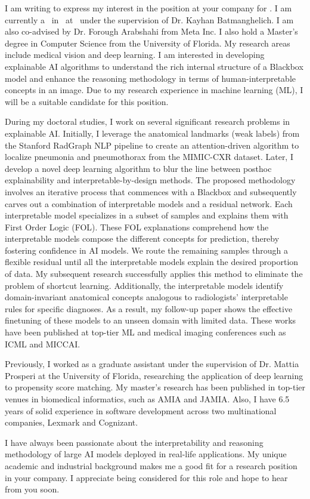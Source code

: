 I am writing to express my interest in the \job position at your company for \timeline. I am currently a \mytitle~in \major~at \university~under the supervision of Dr. Kayhan Batmanghelich. I am also co-advised by Dr. Forough Arabshahi from Meta Inc. I also hold a Master's degree in Computer Science from the University of Florida.
My research areas include medical vision and deep learning. I am interested in developing explainable AI algorithms to understand the rich internal structure of a Blackbox model and enhance the reasoning methodology in terms of human-interpretable concepts in an image. Due to my research experience in machine learning (ML), I will be a suitable candidate for this position.

During my doctoral studies, I work on several significant research problems in explainable AI. Initially, I leverage the anatomical landmarks (weak labels) from the Stanford RadGraph NLP pipeline to create an attention-driven algorithm to localize pneumonia and pneumothorax from the MIMIC-CXR dataset. Later, I develop a novel deep learning algorithm to blur the line between posthoc explainability and interpretable-by-design methods. The proposed methodology involves an iterative process that commences with a Blackbox and subsequently carves out a combination of interpretable models and a residual network. Each interpretable model
specializes in a subset of samples and explains
them with First Order Logic (FOL). These FOL explanations comprehend how the interpretable models compose the different concepts for prediction, thereby fostering confidence in AI models.
We route the remaining samples through a flexible
residual until all the interpretable models explain
the desired proportion of data. My subsequent research successfully applies this method to eliminate the problem of shortcut learning. Additionally, the interpretable models identify domain-invariant anatomical concepts analogous to radiologists' interpretable rules for specific diagnoses. As a result, my follow-up paper shows the effective finetuning of these models to an unseen domain with limited data. These works have been published at top-tier ML and medical imaging conferences such as ICML and MICCAI.

Previously, I worked as a graduate assistant under the supervision of Dr. Mattia Prosperi at the University of Florida, researching the application of deep learning to propensity score matching. My master's research has been published in top-tier venues in biomedical informatics, such as AMIA and JAMIA. Also, I have 6.5 years of solid experience in software development across two multinational companies, Lexmark and Cognizant.

I have always been passionate about the interpretability and reasoning methodology of large AI models deployed in real-life applications. My unique academic and industrial background makes me a good fit for a research position in your company. I appreciate being considered for this role and hope to hear from you soon.